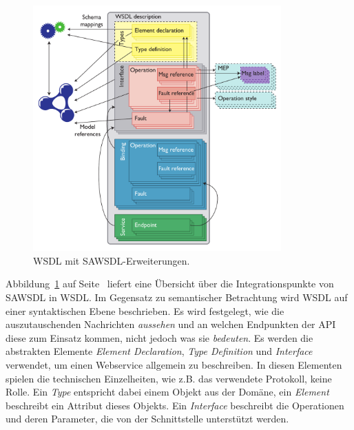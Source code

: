 \begin{figure}[ht]
\centering
\parbox{0.85\textwidth}{
    \includegraphics[width=0.85\textwidth]{media/sawsdl.png}
    \caption{\ac{WSDL} mit \ac{SAWSDL}-Erweiterungen. \cite[S.61]{ky-sawsdl}
}
    \label{f:sawsdl}
}
\end{figure}

Abbildung~\ref{f:sawsdl} auf Seite~\pageref{f:sawsdl} liefert eine Übersicht über die Integrationspunkte von \ac{SAWSDL} in \ac{WSDL}. Im Gegensatz zu semantischer Betrachtung wird \ac{WSDL} auf einer syntaktischen Ebene beschrieben. Es wird festgelegt, wie die auszutauschenden Nachrichten \emph{aussehen} und an welchen Endpunkten der \ac{API} diese zum Einsatz kommen, nicht jedoch was sie \emph{bedeuten}. Es werden die abstrakten Elemente \emph{Element Declaration}, \emph{Type Definition} und \emph{Interface} verwendet, um einen Webservice allgemein zu beschreiben. In diesen Elementen spielen die technischen Einzelheiten, wie z.B. das verwendete Protokoll, keine Rolle. Ein \emph{Type} entspricht dabei einem Objekt aus der Domäne, ein \emph{Element} beschreibt ein Attribut dieses Objekts. Ein \emph{Interface} beschreibt die Operationen und deren Parameter, die von der Schnittstelle unterstützt werden. 


